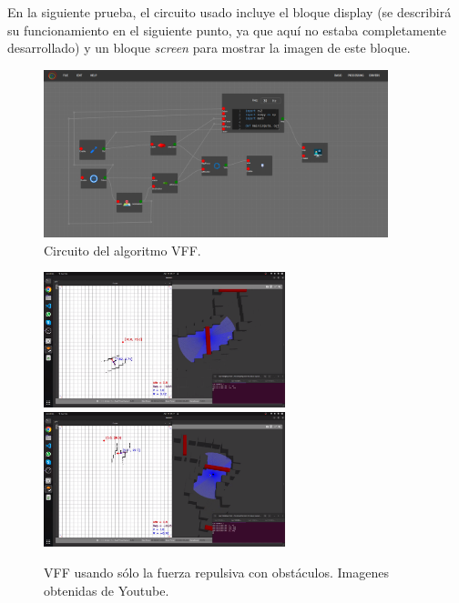 En la siguiente prueba, el circuito usado incluye el bloque display (se describirá su funcionamiento en el siguiente punto, ya que aquí no estaba completamente
desarrollado) y un bloque \textit{screen} para mostrar la imagen de este bloque.

\begin{figure} [H]
    \begin{center}
        \includegraphics[width=10cm]{figs/c6/VFF_disp_circ.png}
    \end{center}
    \caption[Circuito VFF]{Circuito del algoritmo VFF.}
    \label{fig:VFF_disp_circ}
\end{figure}

\begin{figure} [H]
    \begin{center}
        \includegraphics[width=7cm]{figs/c6/VFF_d1.png}
        \includegraphics[width=7cm]{figs/c6/VFF_d2.png}
    \end{center}
    \caption[Secuencia bloque MotorDriverROS2 real]{VFF usando sólo la fuerza repulsiva con obstáculos. Imagenes obtenidas de Youtube\footnotemark.}
    \label{fig:vid_motR}
\end{figure}

